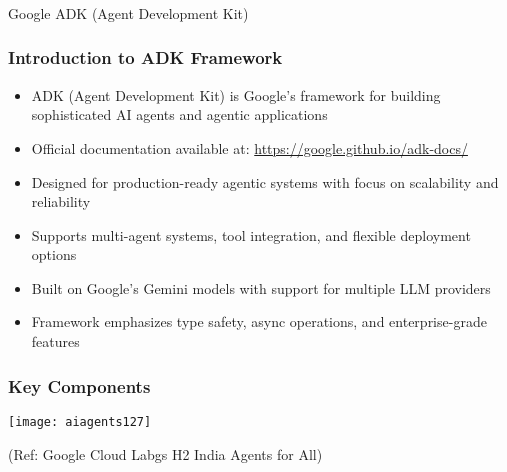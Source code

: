 \begin{frame}[fragile]\frametitle{}
\begin{center}
{\Large Google ADK (Agent Development Kit)}
\end{center}
\end{frame}

\begin{frame}[fragile]\frametitle{Introduction to ADK Framework}
      \begin{itemize}
	\item ADK (Agent Development Kit) is Google's framework for building sophisticated AI agents and agentic applications
	\item Official documentation available at: \url{https://google.github.io/adk-docs/}
	\item Designed for production-ready agentic systems with focus on scalability and reliability
	\item Supports multi-agent systems, tool integration, and flexible deployment options
	\item Built on Google's Gemini models with support for multiple LLM providers
	\item Framework emphasizes type safety, async operations, and enterprise-grade features
	  \end{itemize}
\end{frame}

\begin{frame}[fragile]\frametitle{Key Components}
	
		\begin{center}
		\texttt{[image: aiagents127]}
		
		{\tiny (Ref: Google Cloud Labgs H2 India Agents for All)}
		\end{center}	
\end{frame}

